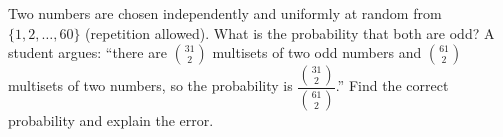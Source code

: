Two numbers are chosen independently and uniformly at random from $\{1,2,\dots,60\}$ (repetition allowed). What is the probability that both are odd? A student argues: ``there are $\binom{31}{2}$ multisets of two odd numbers and $\binom{61}{2}$ multisets of two numbers, so the probability is $\dfrac{\binom{31}{2}}{\binom{61}{2}}$.'' Find the correct probability and explain the error.
